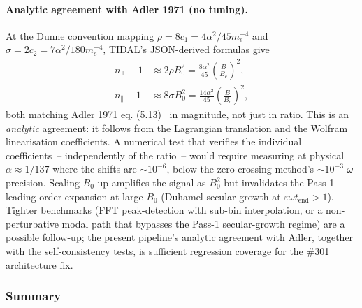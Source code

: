 \paragraph{Analytic agreement with Adler 1971 (no tuning).} At the Dunne convention mapping $\rho = 8c_1 = 4\alpha^2/45m_e^{-4}$ and $\sigma = 2c_2 = 7\alpha^2/180m_e^{-4}$, TIDAL's JSON-derived formulas give
\begin{align*}
  n_\perp - 1 &\approx 2\rho B_0^2 = \tfrac{8\alpha^2}{45}\!\left(\tfrac{B}{B_c}\right)^2, \\
  n_\parallel - 1 &\approx 8\sigma B_0^2 = \tfrac{14\alpha^2}{45}\!\left(\tfrac{B}{B_c}\right)^2,
\end{align*}
both matching Adler 1971 eq. (5.13)~\cite{Adler1971} in magnitude, not just in ratio. This is an \emph{analytic} agreement: it follows from the Lagrangian translation and the Wolfram linearisation coefficients. A numerical test that verifies the individual coefficients~-- independently of the ratio~-- would require measuring at physical $\alpha \approx 1/137$ where the shifts are $\sim 10^{-6}$, below the zero-crossing method's $\sim 10^{-3}$ $\omega$-precision. Scaling $B_0$ up amplifies the signal as $B_0^2$ but invalidates the Pass-1 leading-order expansion at large $B_0$ (Duhamel secular growth at $\varepsilon \omega t_{\mathrm{end}} > 1$). Tighter benchmarks (FFT peak-detection with sub-bin interpolation, or a non-perturbative modal path that bypasses the Pass-1 secular-growth regime) are a possible follow-up; the present pipeline's analytic agreement with Adler, together with the self-consistency tests, is sufficient regression coverage for the \#301 architecture fix.

\subsubsection{Summary}
\label{sec:pr-eh-summary}


